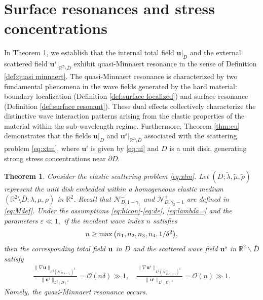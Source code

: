 \documentclass[11pt,reqno,twoside]{amsart}
\newtheorem{thm}{Theorem}[section]
\theoremstyle{definition}
\theoremstyle{remark}
\numberwithin{equation}{section}
\newcommand{\bu}{\mathbf{u}}
\begin{document}
\section{Surface resonances and stress concentrations}
\label{sec:experiments}
In  Theorem \ref{thm:sre}, we establish that the internal total field $\mathbf{u}|_D$ and the external scattered field $\mathbf{u}^s|_{\mathbb{R}^2 \setminus \overline{D}}$ exhibit quasi-Minnaert resonance in the sense of Definition \ref{def:quasi minnaert}. The quasi-Minnaert resonance is characterized by two fundamental phenomena in the wave fields generated by the hard material:
boundary localization (Definition \ref{def:surface localized}) and surface resonance (Definition \ref{def:surface resonant}). These dual effects collectively characterize the distinctive wave interaction patterns arising from the elastic properties of the material within the sub-wavelength regime. Furthermore,  Theorem \ref{thm:eu} demonstrates that the fields $\mathbf{u}|_D$ and $\mathbf{u}^s|_{\mathbb{R}^2 \setminus \overline{D}}$ associated with the scattering problem \eqref{eq:xtm}, where  $\mathbf u^i$ is given by \eqref{eq:ui} and  \( D \) is a unit disk, generating strong stress concentrations near $\partial D$.
\begin{thm}\label{thm:sre}
	Consider the elastic scattering problem \eqref{eq:xtm}. Let $(D;\tilde{\lambda},\tilde{\mu},\tilde{\rho})$ represent the unit disk embedded within a homogeneous elastic medium $(\mathbb{R}^2\setminus\overline{D};\lambda,\mu,\rho)$ in $\mathbb{R}^2$. Recall that $\mathcal{N}_{D,1-\gamma_{1}}^{-}$ and $\mathcal{N}_{D,\gamma_{2}-1}^{+}$ are defined in  \eqref{eq:Mdef}. Under the assumptions \eqref{eq:hicon}-\eqref{eq:de}, \eqref{eq:lambda=} and the parameters $\varepsilon \ll 1,$ if the incident wave index $n$ satisfies 
	\begin{align}\notag
		n\geq \max{\left(n_1,n_2,n_3,n_4, 1/\delta^2\right)},
	\end{align}
	then the corresponding total field ${\bf u}$ in $D$ and the scattered wave field $\mathbf{u}^s$ in $\mathbb R^2 \backslash \overline{D} $ satisfy
	\begin{align}\label{eq:grath1}
		\frac{\|\nabla\mathbf{u}\|_{L^2(\mathcal{N}_{D,1-\gamma_{1}}^{-})^2}}{\|{\bu}^i\|_{L^2(D)^2}}=\mathcal{O}\left(n\delta\right)\gg1,\quad
		\frac{\|\nabla\bu^s\|_{L^2(\mathcal{N}_{D,\gamma_{2}-1}^{+})^2}}{\|\bu^i\|_{L^2(D)^2}}=\mathcal{O}\left({n}\right)\gg1.
	\end{align}
	Namely, the quasi-Minnaert resonance occurs.
\end{thm}
\end{document}
